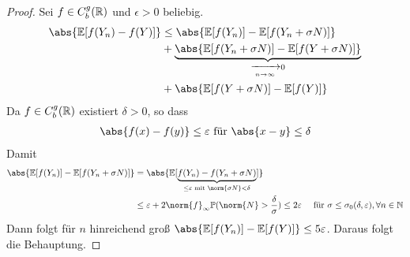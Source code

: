 \begin{proof}
	Sei $f \in C_b^g(\mathbb{R})$ und $\epsilon > 0$ beliebig.
	\begin{align*}
		\abs{\E[f(Y_n)-f(Y)]} &\le \abs{\E[f(Y_n)] - \E[f(Y_n + \sigma N)]}\\
		&+ \underbrace{\abs{\E[f(Y_n + \sigma N)] - \E[f(Y+\sigma N)]}}_{\xrightarrow[n \to \infty]{}0}\\
		&+ \abs{\E[f(Y+\sigma N)] - \E[f(Y)]}
	\end{align*}
	Da $f \in C_b^g(\mathbb{R})$ existiert $\delta > 0$, so dass
	\begin{align*}
		\abs{f(x)-f(y)} \le \epsilon \text{ für } \abs{x-y} \le \delta
	\end{align*}
	Damit
	\begin{align*}
		\abs{\E[f(Y_n)] - \E[f(Y_n + \sigma N)]} &= \abs{\E[\underbrace{f(Y_n) - f(Y_n + \sigma N)}_{\le \epsilon \mit \norm{\sigma N}< \delta}]}\\
		&\le \epsilon + 2 \norm{f}_{\infty}\P(\norm{N} > \frac{\delta}{\sigma}) \le 2 \epsilon \quad \text{ für } \sigma \le \sigma_0(\delta, \epsilon), \forall n \in \N
	\end{align*}
	Dann folgt für $n$ hinreichend groß $\abs{\E[f(Y_n)] - \E[f(Y)]} \le 5 \epsilon$. Daraus folgt die Behauptung.
\end{proof}
